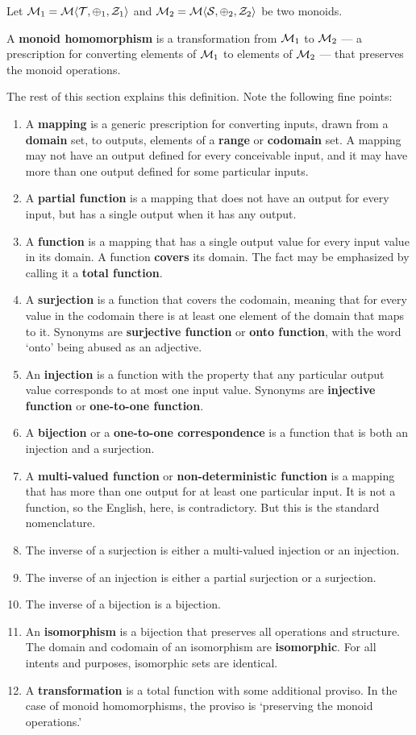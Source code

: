 Let $\mathcal{M}_{1}=\mathcal{M}\langle{\mathcal{T}},{\oplus_{1}},{\mathcal{Z}_{1}}\rangle$ and $\mathcal{M}_{2}=\mathcal{M}\langle{\mathcal{S}},{\oplus_{2}},{\mathcal{Z}_{2}}\rangle$ be two monoids. 
\begin{definition}
A \textbf{monoid homomorphism} is a transformation from $\mathcal{M}_{1}$ to $\mathcal{M}_{2}$ --- a prescription for converting elements of $\mathcal{M}_{1}$ to elements of $\mathcal{M}_{2}$ --- that preserves the monoid operations. 
\label{def:monoidhomomorphism}
\end{definition}
The rest of this section explains this definition. Note the following fine points:
\begin{enumerate}
  \item A \textbf{mapping} is a generic prescription for converting inputs, drawn from a \textbf{domain} set, to outputs, elements of a \textbf{range} or \textbf{codomain} set. A mapping may not have an output defined for every conceivable input, and it may have more than one output defined for some particular inputs.
	\item A \textbf{partial function} is a mapping that does not have an output for every input, but has a single output when it has any output.
	\item A \textbf{function} is a mapping that has a single output value for every input value in its domain. A function \textbf{covers} its domain. The fact may be emphasized by calling it a \textbf{total function}.
	\item A \textbf{surjection} is a function that covers the codomain, meaning that for every value in the codomain there is at least one element of the domain that maps to it. Synonyms are \textbf{surjective function} or \textbf{onto function}, with the word `onto' being abused as an adjective. 
	\item An \textbf{injection} is a function with the property that any particular output value corresponds to at most one input value. Synonyms are \textbf{injective function} or \textbf{one-to-one function}. 
  \item A \textbf{bijection} or a \textbf{one-to-one correspondence} is a function that is both an injection and a surjection. 
	\item A \textbf{multi-valued function} or \textbf{non-deterministic function} is a mapping that has more than one output for at least one particular input. It is not a function, so the English, here, is contradictory. But this is the standard nomenclature. 
	\item The inverse of a surjection is either a multi-valued injection or an injection.
	\item The inverse of an injection is either a partial surjection or a surjection.
	\item The inverse of a bijection is a bijection. 
	\item An \textbf{isomorphism} is a bijection that preserves all operations and structure. The domain and codomain of an isomorphism are \textbf{isomorphic}. For all intents and purposes, isomorphic sets are identical.
	\item A \textbf{transformation} is a total function with some additional proviso. In the case of monoid homomorphisms, the proviso is `preserving the monoid operations.'
\end{enumerate}


